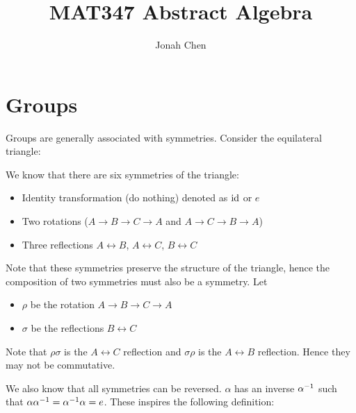 \documentclass[a4paper]{article}
\title{MAT347 Abstract Algebra}
\author{Jonah Chen}
\date{}
\begin{document}
\maketitle
\sffamily
\section{Groups}
Groups are generally associated with symmetries. Consider the equilateral triangle:
\begin{center}
\end{center}
We know that there are six symmetries of the triangle:
\begin{itemize}
    \item Identity transformation (do nothing) denoted as $\mathrm{id}$ or $e$
    \item Two rotations ($A\to B\to C\to A$ and $A\to C\to B\to A$)
    \item Three reflections %
    $A \leftrightarrow B$, $A \leftrightarrow C$, $B \leftrightarrow C$
\end{itemize}
Note that these symmetries preserve the structure of the triangle, hence the composition of two symmetries must also be a symmetry. Let
\begin{itemize}
    \item $\rho$ be the rotation $A\to B\to C\to A$
    \item $\sigma$ be the reflections $B\leftrightarrow C$
\end{itemize}
Note that $\rho\sigma$ is the $A\leftrightarrow C$ reflection and $\sigma\rho$ is the $A\leftrightarrow B$ reflection. Hence they may not be commutative.


We also know that all symmetries can be reversed. $\alpha$ has an inverse $\alpha^{-1}$ such that $\alpha\alpha^{-1} = \alpha^{-1}\alpha = e$. These inspires the following definition:
\end{document}
